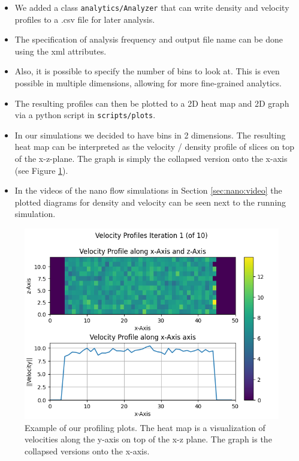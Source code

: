 \documentclass{article}
\begin{document}
    \begin{itemize}
        \item We added a class \texttt{analytics/Analyzer} that can write density and velocity profiles to a .csv file for later analysis.
        \item The specification of analysis frequency and output file name can be done using the xml attributes.
        \item Also, it is possible to specify the number of bins to look at. This is even possible in multiple dimensions, allowing for more fine-grained analytics.
        \item The resulting profiles can then be plotted to a 2D heat map and 2D graph via a python script in \texttt{scripts/plots}.
        \item In our simulations we decided to have bins in 2 dimensions. The resulting heat map can be interpreted as the velocity / density profile of slices on top of the x-z-plane. The graph is simply the collapsed version onto the x-axis (see Figure \ref{fig:plot_xmpl}).
        \item In the videos of the nano flow simulations in Section \ref{sec:nano:video} the plotted diagrams for density and velocity can be seen next to the running simulation.
    \end{itemize}

    \begin{figure}[H]
        \centering
        \includegraphics[width=1\textwidth]{../../res/Profile_example.png}
        \caption{Example of our profiling plots. The heat map is a visualization of velocities along the y-axis on top of the x-z plane. The graph is the collapsed versions onto the x-axis. }
        \label{fig:plot_xmpl}
    \end{figure}
\end{document}
